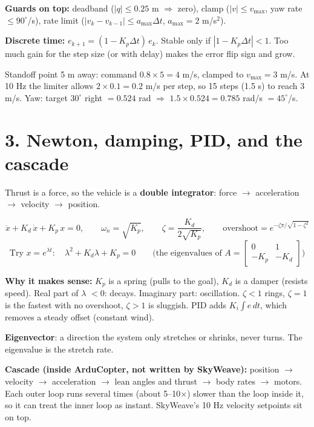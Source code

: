 \documentclass[10pt]{article}
\newcommand{\why}[1]{\par\textbf{\textcolor{idea}{Why it makes sense:}} #1}
\begin{document}
\textbf{Guards on top:} deadband ($|q| \le 0.25$ m $\Rightarrow$ zero), clamp
($|v| \le v_\text{max}$, yaw rate $\le 90^\circ$/s), rate limit
($|v_k - v_{k-1}| \le a_\text{max}\Delta t$, $a_\text{max} = 2$ m/s$^2$).

\textbf{Discrete time:} $e_{k+1} = (1 - K_p\Delta t)\, e_k$. Stable only if
$|1 - K_p\Delta t| < 1$. Too much gain for the step size (or with delay) makes the error
flip sign and grow.
\begin{exbox}
Standoff point 5 m away: command $0.8 \times 5 = 4$ m/s, clamped to $v_\text{max}=3$ m/s.
At 10 Hz the limiter allows $2 \times 0.1 = 0.2$ m/s per step, so 15 steps (1.5 s) to
reach 3 m/s. Yaw: target $30^\circ$ right $= 0.524$ rad $\Rightarrow$ $1.5 \times 0.524
= 0.785$ rad/s $= 45^\circ$/s.
\end{exbox}

\section*{3. Newton, damping, PID, and the cascade}
Thrust is a force, so the vehicle is a \textbf{double integrator}: force $\to$
acceleration $\to$ velocity $\to$ position.
\begin{eqbox}
\[
\ddot x + K_d\,\dot x + K_p\, x = 0,\qquad
\omega_n = \sqrt{K_p},\qquad \zeta = \frac{K_d}{2\sqrt{K_p}},\qquad
\text{overshoot} = e^{-\zeta\pi/\sqrt{1-\zeta^2}}
\]
\[
\text{Try } x = e^{\lambda t}:\quad \lambda^2 + K_d\lambda + K_p = 0
\qquad\text{(the eigenvalues of } A = \begin{bmatrix}0 & 1\\ -K_p & -K_d\end{bmatrix})
\]
\end{eqbox}
\why{$K_p$ is a spring (pulls to the goal), $K_d$ is a damper (resists speed). Real part
of $\lambda$ $<0$: decays. Imaginary part: oscillation. $\zeta<1$ rings, $\zeta=1$ is the
fastest with no overshoot, $\zeta>1$ is sluggish. PID adds $K_i\!\int e\,dt$, which
removes a steady offset (constant wind).}

\textbf{Eigenvector}: a direction the system only stretches or shrinks, never turns. The
eigenvalue is the stretch rate.

\textbf{Cascade (inside ArduCopter, not written by SkyWeave):} position $\to$ velocity
$\to$ acceleration $\to$ lean angles and thrust $\to$ body rates $\to$ motors. Each outer
loop runs several times (about 5--10$\times$) slower than the loop inside it, so it can
treat the inner loop as instant. SkyWeave's 10 Hz velocity setpoints sit on top.
\end{document}
